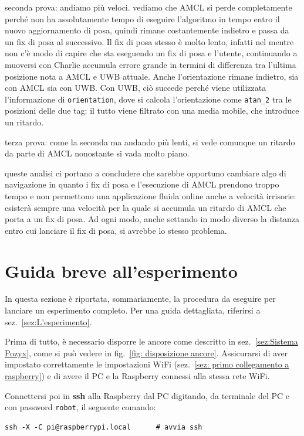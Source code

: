 seconda prova: andiamo più veloci. vediamo che AMCL si perde completamente perché non ha assolutamente tempo di eseguire l'algoritmo in tempo entro il nuovo aggiornamento di 
posa, quindi rimane costantemente indietro e passa da un fix di posa al successivo. Il fix di posa stesso è molto lento, infatti nel mentre non c'è modo di capire
che sta eseguendo un fix di posa e l'utente, continuando a muoversi con Charlie accumula errore grande in termini di differenza tra l'ultima posizione nota a AMCL e UWB attuale.
Anche l'orientazione rimane indietro, sia con AMCL sia con UWB. Con UWB, ciò succede perché viene utilizzata l'informazione di \verb|orientation|, dove si calcola l'orientazione come \verb|atan_2| tra le posizioni delle due tag: il tutto viene filtrato con una media mobile, che introduce un ritardo.

terza prova: come la seconda ma andando più lenti, si vede comunque un ritardo da parte di AMCL nonostante si vada molto piano.

queste analisi ci portano a concludere che sarebbe opportuno cambiare algo di navigazione in quanto i fix di posa e l'esecuzione di AMCL prendono troppo tempo e non permettono una applicazione fluida online anche a velocità irrisorie: esisterà sempre una velocità per la quale si accumula un ritardo di AMCL che porta a un fix di posa. Ad ogni modo, anche settando in modo diverso la distanza entro cui lanciare il fix di posa, si avrebbe lo stesso problema.

\newpage
\section{Guida breve all'esperimento}
\label{sez: Guida breve all'esperimento}
In questa sezione è riportata, sommariamente, la procedura da eseguire per lanciare un esperimento completo. Per una guida dettagliata, riferirsi a 
sez.~\ref{sez:L'esperimento}. 

Prima di tutto, è necessario disporre le ancore come descritto in sez.~\ref{sez:Sistema Pozyx}, come si può vedere in fig.~\ref{fig: disposizione ancore}. 
Assicurarsi di aver impostato correttamente le impostazioni WiFi (sez.~\ref{sez: primo collegamento a raspberry}) e di avere il PC e la Raspberry connessi 
alla stessa rete WiFi.


Connettersi poi in \textbf{ssh} alla Raspberry dal PC digitando, da terminale del PC e con password \texttt{robot}, il seguente comando:
\begin{lstlisting}[style=bashPC]
	ssh -X -C pi@raspberrypi.local		# avvia ssh
\end{lstlisting}

